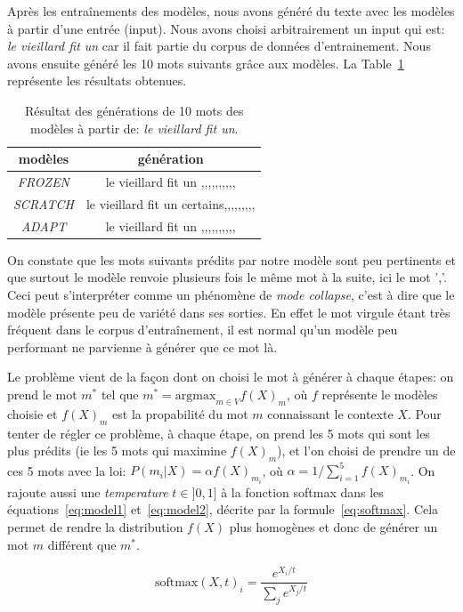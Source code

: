 \documentclass[a4paper]{article}
\begin{document}
Après les entraînements des modèles, nous avons généré du texte avec les modèles à partir d'une entrée (input). Nous avons choisi
arbitrairement un input qui est: \textit{le vieillard fit un} car il fait partie du corpus de données d'entrainement.
Nous avons ensuite généré les 10 mots suivants grâce aux modèles. La Table~\ref{tab:generate} représente les résultats obtenues. 

\begin{table}[ht]
  \centering
  \begin{tabular}{|c|c|}
      \hline
      modèles & génération \\
      \hline
      \textit{FROZEN} & le vieillard fit un ,,,,,,,,,, \\
      \textit{SCRATCH} & le vieillard fit un certains,,,,,,,,,\\
      \textit{ADAPT} & le vieillard fit un ,,,,,,,,,,\\
      \hline
  \end{tabular}
  \caption{Résultat des générations de 10 mots des modèles à partir de: \textit{le vieillard fit un}.}
  \label{tab:generate}
\end{table}

On constate que les mots suivants prédits par notre modèle sont peu pertinents et que surtout le modèle renvoie plusieurs fois le 
même mot à la suite, ici le mot ','. Ceci peut s'interpréter comme un phénomène de \textit{mode collapse}, c'est à dire 
que le modèle présente peu de variété dans ses sorties. En effet le mot virgule étant très fréquent dans le corpus 
d'entraînement, il est normal qu'un modèle peu performant ne parvienne à générer que ce mot là.

Le problème vient de la façon dont on choisi le mot à générer à chaque étapes: on prend le mot $m^*$ tel que
$m^* = \text{argmax}_{m \in V} f(X)_m$, où $f$ représente le modèles choisie et $f(X)_m$ est la propabilité du mot $m$ connaissant 
le contexte $X$. Pour tenter de régler ce problème, à chaque étape, on prend les 5
mots qui sont les plus prédits (ie les 5 mots qui maximine $f(X)_m$), et l'on choisi de prendre un de ces 5 mots avec la loi: 
$P(m_i|X) = \alpha f(X)_{m_i}$, où $\alpha = 1 / \sum_{i=1}^{5} f(X)_{m_i}$. On rajoute aussi une \textit{temperature} $t\in ]0, 1]$ 
à la fonction softmax dans 
les équations~\ref{eq:model1} et~\ref{eq:model2}, décrite par la formule~\ref{eq:softmax}. Cela permet de rendre
la distribution $f(X)$ plus homogènes et donc de générer un mot $m$ différent que $m^*$.

\begin{equation}
  \text{softmax}(X, t)_i = \frac{e^{X_i/t}}{\sum_{j}e^{X_j/t}}
  \label{eq:softmax}
\end{equation}
\end{document}
